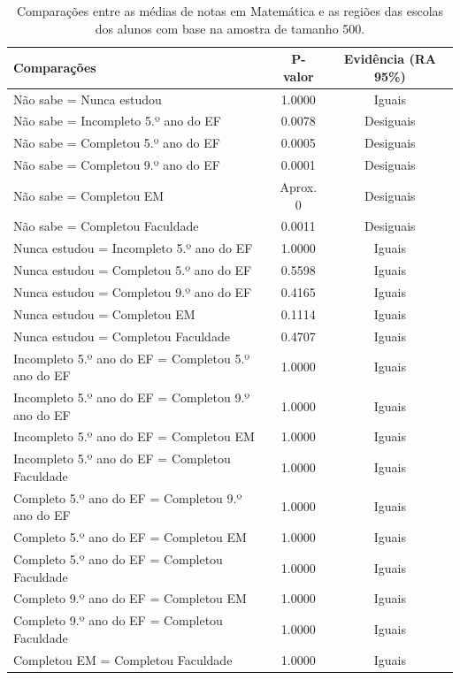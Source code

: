 \newpage
\begin{table}[htb]
    \centering
\caption{\label{comp_MT}Comparações entre as médias de notas em Matemática e as regiões das escolas dos alunos com base na amostra de tamanho 500.}
    \begin{tabular}{lcc}
    \toprule
    Comparações & P-valor & Evidência (RA 95\%)\\
    \midrule \midrule
    Não sabe = Nunca estudou & 1.0000 & Iguais\\
    Não sabe = Incompleto 5.º ano do EF  & 0.0078 & Desiguais\\
    Não sabe = Completou 5.º ano do EF  & 0.0005 & Desiguais\\
    Não sabe = Completou 9.º ano do EF  & 0.0001 & Desiguais\\
    Não sabe = Completou EM & Aprox. 0 & Desiguais\\
    Não sabe = Completou Faculdade & 0.0011 & Desiguais\\
    Nunca estudou = Incompleto 5.º ano do EF  & 1.0000 & Iguais\\
    Nunca estudou = Completou 5.º ano do EF  & 0.5598 & Iguais\\
    Nunca estudou = Completou 9.º ano do EF  & 0.4165 & Iguais\\
    Nunca estudou = Completou EM & 0.1114 & Iguais\\
    Nunca estudou = Completou Faculdade & 0.4707 & Iguais\\
    Incompleto 5.º ano do EF = Completou 5.º ano do EF  & 1.0000 & Iguais\\
    Incompleto 5.º ano do EF = Completou 9.º ano do EF  & 1.0000 & Iguais\\
    Incompleto 5.º ano do EF = Completou EM & 1.0000 & Iguais\\
    Incompleto 5.º ano do EF = Completou Faculdade & 1.0000 & Iguais\\
    Completo 5.º ano do EF = Completou 9.º ano do EF  & 1.0000 & Iguais\\
    Completo 5.º ano do EF = Completou EM & 1.0000 & Iguais\\
    Completo 5.º ano do EF = Completou Faculdade & 1.0000 & Iguais\\
    Completo 9.º ano do EF = Completou EM & 1.0000 & Iguais\\
    Completo 9.º ano do EF = Completou Faculdade & 1.0000 & Iguais\\
    Completou EM = Completou Faculdade & 1.0000 & Iguais\\
    \bottomrule
    \end{tabular}
    \centering
    
\end{table}
